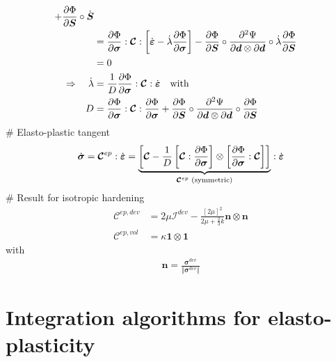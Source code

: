 \documentclass[]{scrartcl}
\begin{document}
\begin{easylist}
\begin{align*}
  + \frac{\partial \Phi}{\partial \boldsymbol{S}} \circ \dot{\boldsymbol{S}} \\
 &= \frac{\partial \Phi}{\partial \boldsymbol{\sigma}} : \boldsymbol{\mathcal{C}} : \left[ \dot{\boldsymbol{\varepsilon}} - \dot{\lambda} \frac{\partial \Phi}{\partial \boldsymbol{\sigma}} \right]
  -  \frac{\partial \Phi}{\partial \boldsymbol{S}} \circ \frac{\partial^{2} \Psi}{\partial \boldsymbol{d} \otimes \partial \boldsymbol{d}} \circ \dot{\lambda} \frac{\partial \Phi}{\partial \boldsymbol{S}} \\
 &= 0 \\
\Rightarrow \quad 
\dot{\lambda}
  &= \frac{1}{D} \frac{\partial \Phi}{\partial \boldsymbol{\sigma}} : \boldsymbol{\mathcal{C}} : \dot{\boldsymbol{\varepsilon}}
\quad \textnormal{with} \\
D 
  &= \frac{\partial \Phi}{\partial \boldsymbol{\sigma}} : \boldsymbol{\mathcal{C}} : \frac{\partial \Phi}{\partial \boldsymbol{\sigma}}
  + \frac{\partial \Phi}{\partial \boldsymbol{S}} \circ \frac{\partial^{2} \Psi}{\partial \boldsymbol{d} \otimes \partial \boldsymbol{d}} \circ \frac{\partial \Phi}{\partial \boldsymbol{S}}
\end{align*}
# Elasto-plastic tangent
\begin{gather*}
\dot{\boldsymbol{\sigma}} 
  = \boldsymbol{\mathcal{C}}^{ep} : \dot{\boldsymbol{\varepsilon}}
  = \underbrace{\left[ \boldsymbol{\mathcal{C}} - \frac{1}{D} \left[ \boldsymbol{\mathcal{C}} : \frac{\partial \Phi}{\partial \boldsymbol{\sigma}} \right] \otimes \left[ \frac{\partial \Phi}{\partial \boldsymbol{\sigma}} : \boldsymbol{\mathcal{C}} \right] \right]}_{\boldsymbol{\mathcal{C}}^{ep} \textnormal{ (symmetric)}} : \dot{\boldsymbol{\varepsilon}}
\end{gather*}
# Result for isotropic hardening
\begin{align*}
\boldsymbol{\mathcal{C}}^{ep, dev}
 &= 2 \mu \boldsymbol{\mathcal{I}}^{dev} - \frac{\left[ 2\mu \right]^{2}}{2\mu + \frac{2}{3}k} \boldsymbol{n} \otimes \boldsymbol{n} \\
\boldsymbol{\mathcal{C}}^{ep, vol}
 &= \kappa \boldsymbol{1} \otimes \boldsymbol{1}
\end{align*}
with
\begin{gather*}
\boldsymbol{n}
  = \frac{\boldsymbol{\sigma}^{dev}}{\Vert \boldsymbol{\sigma}^{dev} \Vert}
\end{gather*}
\end{easylist}

\section{Integration algorithms for elasto-plasticity}
\end{document}
